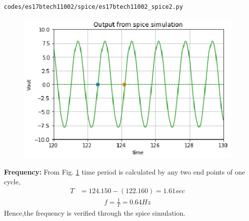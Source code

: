\begin{enumerate}[label=\arabic*.,ref=\theenumi]
\begin{lstlisting}
codes/es17btech11002/spice/es17btech11002_spice2.py
\end{lstlisting}
\begin{figure}[!ht]
\centering
\includegraphics[width=\columnwidth]{./figs/es17btech11002/es17btech11002_spice2.eps}
\caption{}
\label{fig:es17btech11002_spice2}
\end{figure}
\renewcommand{\thefigure}{\theenumi}
\textbf{Frequency:} From Fig. \ref{fig:es17btech11002_spice2} time period is calculated by any two end points of one cycle,
\begin{align}
T&=124.150-(122.160) = 1.61 sec
\end{align}
\begin{align}
f = \frac{1}{T} = 0.64 Hz
\end{align}
Hence,the frequency is verified through the spice simulation.
\end{enumerate}

